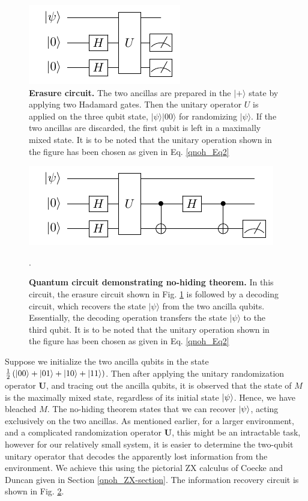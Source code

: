 \begin{subfigures}
\begin{figure}[]
\includegraphics[scale=2.0]{qnoh_Fig1a}
\caption{\textbf{Erasure circuit.} The two ancillas are prepared in the $|+\rangle$ state by applying two Hadamard gates. Then the unitary operator $U$ is applied on the three qubit state, $|\psi\rangle|00\rangle$ for randomizing $|\psi\rangle$. If the two ancillas are discarded, the first qubit is left in a maximally mixed state. It is to be noted that the unitary operation shown in the figure has been chosen as given in Eq. \eqref{qnoh_Eq2}}
\label{qnoh_Fig1(a)}
\end{figure}

\begin{figure}
\includegraphics[scale=2.0]{qnoh_Fig1b}
\caption{\textbf{Quantum circuit demonstrating no-hiding theorem.} In this circuit, the erasure circuit shown in Fig. \ref{qnoh_Fig1(a)} is followed by a decoding circuit, which recovers the state $|\psi\rangle$ from the two ancilla qubits. Essentially, the decoding operation transfers the state $|\psi\rangle$ to the third qubit. It is to be noted that the unitary operation shown in the figure has been chosen as given in Eq. \eqref{qnoh_Eq2}}.
\label{qnoh_Fig1(b)}
\end{figure}

\end{subfigures}

Suppose we initialize the two ancilla qubits in the state $\frac{1}{2} \left(\ket{00}+\ket{01}+\ket{10}+\ket{11}\right)$. Then after applying the unitary randomization operator $\mathbf{U}$, and tracing out the ancilla qubits, it is observed that the state of $M$ is the maximally mixed state, regardless of its initial state $\ket{\psi}$. Hence, we have bleached $M$. The no-hiding theorem states that we can recover $\ket{\psi}$, acting exclusively on the two ancillas. As mentioned earlier, for a larger environment, and a complicated randomization operator $\mathbf{U}$, this might be an intractable task, however for our relatively small system, it is easier to determine the two-qubit unitary operator that decodes the apparently lost information from the environment. We achieve this using the pictorial ZX calculus of Coecke and Duncan \cite{qnoh_Bob1} given in Section \ref{qnoh_ZX-section}. The information recovery circuit is shown in Fig. \ref{qnoh_Fig1(b)}.
 
